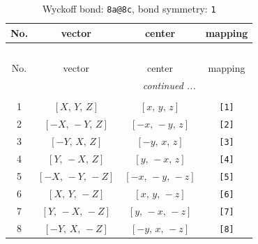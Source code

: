 \documentclass[fleqn,8pt]{jsarticle}
\begin{document}
\begin{longtable}{cccc}
\caption{Wyckoff bond: {\tt 8a@8c}, bond symmetry: {\tt 1}}
 \\
 \hline \hline
No. & vector & center & mapping \\ \hline \endfirsthead

\multicolumn{3}{l}{\tablename\ \thetable{}} \\
 \hline \hline
No. & vector & center & mapping \\ \hline \endhead

 \hline \hline
\multicolumn{3}{r}{\footnotesize\it continued ...} \\ \endfoot

 \hline \hline
\multicolumn{3}{r}{} \\ \endlastfoot

1 & $\left[ X,\, Y,\, Z \right]$ & $\left[ x,\, y,\, z \right]$ & {\tt [1]} \\ \hline
2 & $\left[ - X,\, - Y,\, Z \right]$ & $\left[ - x,\, - y,\, z \right]$ & {\tt [2]} \\ \hline
3 & $\left[ - Y,\, X,\, Z \right]$ & $\left[ - y,\, x,\, z \right]$ & {\tt [3]} \\ \hline
4 & $\left[ Y,\, - X,\, Z \right]$ & $\left[ y,\, - x,\, z \right]$ & {\tt [4]} \\ \hline
5 & $\left[ - X,\, - Y,\, - Z \right]$ & $\left[ - x,\, - y,\, - z \right]$ & {\tt [5]} \\ \hline
6 & $\left[ X,\, Y,\, - Z \right]$ & $\left[ x,\, y,\, - z \right]$ & {\tt [6]} \\ \hline
7 & $\left[ Y,\, - X,\, - Z \right]$ & $\left[ y,\, - x,\, - z \right]$ & {\tt [7]} \\ \hline
8 & $\left[ - Y,\, X,\, - Z \right]$ & $\left[ - y,\, x,\, - z \right]$ & {\tt [8]} \\
\end{longtable}
\end{document}
